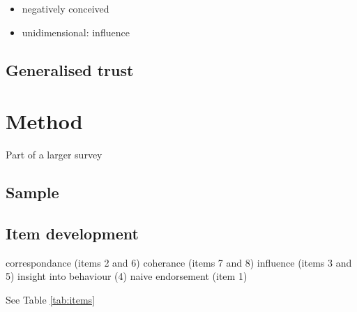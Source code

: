 \documentclass[
  ,jou,floatsintext]{apa6}
\providecommand{\tightlist}{%
  \setlength{\itemsep}{0pt}\setlength{\parskip}{0pt}}
\begin{document}
\begin{itemize}
\tightlist
\item
  negatively conceived
\item
  unidimensional: influence
\end{itemize}

\hypertarget{generalised-trust}{%
\subsection{Generalised trust}\label{generalised-trust}}

\hypertarget{method}{%
\section{Method}\label{method}}

Part of a larger survey

\hypertarget{sample}{%
\subsection{Sample}\label{sample}}

\hypertarget{item-development}{%
\subsection{Item development}\label{item-development}}

correspondance (items 2 and 6)
coherance (items 7 and 8)
influence (items 3 and 5)
insight into behaviour (4)
naive endorsement (item 1)

See Table \ref{tab:items}
\end{document}
